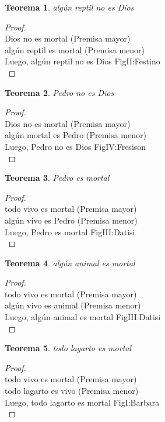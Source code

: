﻿\documentclass[12pt]{book}
\newtheorem{theorem}{Teorema}[chapter]
\newtheorem{proof}{Demostración}
\begin{document}
\begin{theorem}
algún reptil no es Dios
\label{th: 109}
\end{theorem}\begin{proof}\\Dios no es mortal	 (Premisa mayor) \\algún reptil es mortal	 (Premisa menor) \\Luego, algún reptil no es Dios	FigII:Festino \\ \end{proof}
\begin{theorem}
Pedro no es Dios
\label{th: 110}
\end{theorem}\begin{proof}\\Dios no es mortal	 (Premisa mayor) \\algún mortal es Pedro	 (Premisa menor) \\Luego, Pedro no es Dios	FigIV:Fresison \\ \end{proof}
\begin{theorem}
Pedro es mortal
\label{th: 111}
\end{theorem}\begin{proof}\\todo vivo es mortal	 (Premisa mayor) \\algún vivo es Pedro	 (Premisa menor) \\Luego, Pedro es mortal	FigIII:Datisi \\ \end{proof}
\begin{theorem}
algún animal es mortal
\label{th: 112}
\end{theorem}\begin{proof}\\todo vivo es mortal	 (Premisa mayor) \\algún vivo es animal	 (Premisa menor) \\Luego, algún animal es mortal	FigIII:Datisi \\ \end{proof}
\begin{theorem}
todo lagarto es mortal
\label{th: 113}
\end{theorem}\begin{proof}\\todo vivo es mortal	 (Premisa mayor) \\todo lagarto es vivo	 (Premisa menor) \\Luego, todo lagarto es mortal	FigI:Barbara \\ \end{proof}
\end{document}
